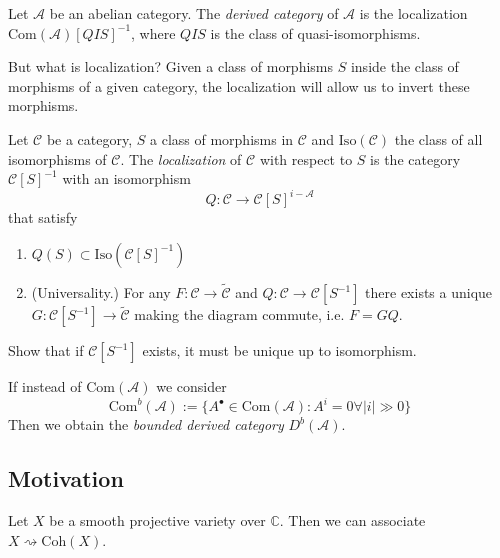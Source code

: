 \begin{definition}
\label{definition-derived-category}
Let $\mathcal{A}$ be an abelian category. The {\it derived category} of
$\mathcal{A}$ is the localization $\text{Com}(\mathcal{A})[QIS]^{-1}$, where
$QIS$ is the class of quasi-isomorphisms.
\end{definition}

But what is localization? Given a class of morphisms $S$ inside the class of
morphisms of a given category, the localization will allow us to invert these
morphisms.

\begin{definition}
\label{definition-localization-of-category}
Let $\mathcal{C}$ be a category, $S$ a class of morphisms in
$\mathcal{C}$ and $\text{Iso}(\mathcal{C})$ the class of all isomorphisms of
$\mathcal{C}$. The {\it localization} of $\mathcal{C}$ with respect to $S$ is
the category $\mathcal{C}[S]^{-1}$ with an isomorphism 
$$
Q:\mathcal{C}\to \mathcal{C}[S]^{i-\mathcal{A}}
$$
that satisfy
\begin{enumerate}
\item $Q(S) \subset \text{Iso}(\mathcal{C}[S]^{-1})$
\item (Universality.) For any $F:\mathcal{C}\to \tilde{\mathcal{C}}$ and
$Q:\mathcal{C}\to \mathcal{C}[S^{-1}]$ there exists a unique
$G:\mathcal{C}[S^{-1}]\to \tilde{ \mathcal{C}}$ making the diagram commute, i.e.
$F=GQ$.
\end{enumerate}
\end{definition}

\begin{exercise}
\label{exercise-uniqueness-of-localization}
Show that if $\mathcal{C}[S^{-1}]$ exists, it must be unique up to isomorphism.
\end{exercise}

\begin{definition}
\label{definition-bounded-derived-category}
If instead of $\text{Com}(\mathcal{A})$ we consider
$$
\text{Com}^b(\mathcal{A}):=\{A^{\bullet} \in \text{Com}(\mathcal{A}):
A^i=0\forall  |i|\gg 0\}
$$
Then we obtain the {\it bounded derived category} $D^b(\mathcal{A})$.
\end{definition}

\subsection*{Motivation}
\label{subsection-motivation}

Let $X$ be a smooth projective variety over $\mathbb{C}$. Then
we can associate $X\rightsquigarrow \text{Coh}(X)$.

